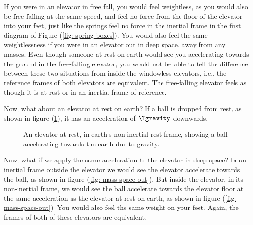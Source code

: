 If you were in an elevator in free fall, you would feel weightless, as you would also be free-falling at the same speed, and feel no force from the floor of the elevator into your feet, just like the springs feel no force in the inertial frame in the first diagram of Figure (\ref{fig: spring boxes}).
You would also feel the same weightlessness if you were in an elevator out in deep space, away from any masses.
Even though someone at rest on earth would see you accelerating towards the ground in the free-falling elevator, you would not be able to tell the difference between these two situations from inside the windowless elevators, i.e., the reference frames of both elevators are equivalent.
The free-falling elevator feels as though it is at rest or in an inertial frame of reference.

Now, what about an elevator at rest on earth? If a ball is dropped from rest, as shown in figure (\ref{fig: mass-earth}), it has an acceleration of $\Tgravity$ downwards.

\begin{figure}[htbp]
        \centering
        \caption{An elevator at rest, in earth's non-inertial rest frame, showing a ball accelerating towards the earth due to gravity.}
        \label{fig: mass-earth}
\end{figure}

Now, what if we apply the same acceleration to the elevator in deep space?
In an inertial frame outside the elevator we would see the elevator accelerate towards the ball, as shown in figure (\ref{fig: mass-space-out}).
But inside the elevator, in its non-inertial frame, we would see the ball accelerate towards the elevator floor at the same acceleration as the elevator at rest on earth, as shown in figure (\ref{fig: mass-space-out}).
You would also feel the same weight on your feet.
Again, the frames of both of these elevators are equivalent.


